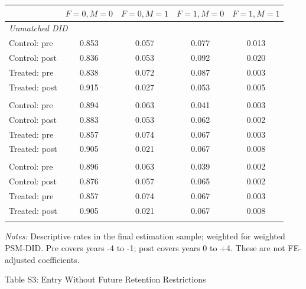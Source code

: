 \documentclass[10pt]{article}
\begin{document}
\begin{tabular*}{\textwidth}{@{\extracolsep{\fill}}lcccc@{}}
\toprule
 & $F=0,M=0$ & $F=0,M=1$ & $F=1,M=0$ & $F=1,M=1$ \\
\midrule
\multicolumn{5}{l}{\textit{Unmatched DID}} \\
Control: pre & 0.853 & 0.057 & 0.077 & 0.013 \\
Control: post & 0.836 & 0.053 & 0.092 & 0.020 \\
Treated: pre & 0.838 & 0.072 & 0.087 & 0.003 \\
Treated: post & 0.915 & 0.027 & 0.053 & 0.005 \\
\addlinespace
\multicolumn{5}{l}{\textit{Unweighted PSM-DID}} \\
Control: pre & 0.894 & 0.063 & 0.041 & 0.003 \\
Control: post & 0.883 & 0.053 & 0.062 & 0.002 \\
Treated: pre & 0.857 & 0.074 & 0.067 & 0.003 \\
Treated: post & 0.905 & 0.021 & 0.067 & 0.008 \\
\addlinespace
\multicolumn{5}{l}{\textit{Weighted PSM-DID}} \\
Control: pre & 0.896 & 0.063 & 0.039 & 0.002 \\
Control: post & 0.876 & 0.057 & 0.065 & 0.002 \\
Treated: pre & 0.857 & 0.074 & 0.067 & 0.003 \\
Treated: post & 0.905 & 0.021 & 0.067 & 0.008 \\
\addlinespace
\bottomrule\end{tabular*}
\medskip\par\fontsize{9}{11}\selectfont
\textit{Notes:} Descriptive rates in the final estimation sample; weighted for weighted PSM-DID. Pre covers years -4 to -1; post covers years 0 to +4. These are not FE-adjusted coefficients.
\par\fontsize{10}{12}\selectfont
\clearpage
\begin{center}\large Table S3: Entry Without Future Retention Restrictions\end{center}
\end{document}

